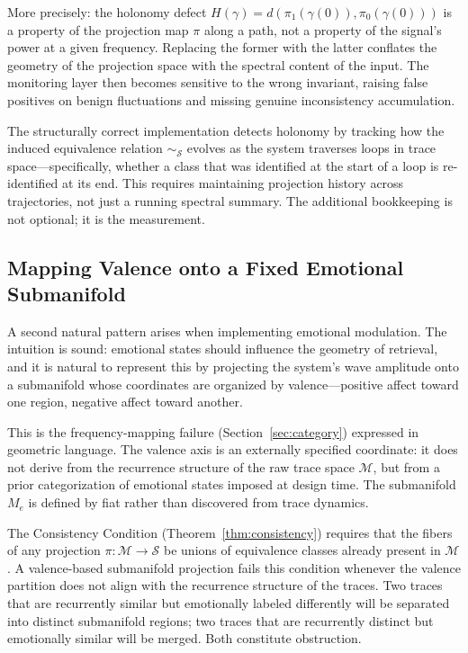 \documentclass[12pt,a4paper]{article}
\begin{document}
More precisely: the holonomy defect $H(\gamma) = d(\pi_1(\gamma(0)), \pi_0(\gamma(0)))$ is a property of the projection map $\pi$ along a path, not a property of the signal's power at a given frequency. Replacing the former with the latter conflates the geometry of the projection space with the spectral content of the input. The monitoring layer then becomes sensitive to the wrong invariant, raising false positives on benign fluctuations and missing genuine inconsistency accumulation.

The structurally correct implementation detects holonomy by tracking how the induced equivalence relation $\sim_\mathcal{S}$ evolves as the system traverses loops in trace space---specifically, whether a class that was identified at the start of a loop is re-identified at its end. This requires maintaining projection history across trajectories, not just a running spectral summary. The additional bookkeeping is not optional; it is the measurement.

\subsection{Mapping Valence onto a Fixed Emotional Submanifold}

A second natural pattern arises when implementing emotional modulation. The intuition is sound: emotional states should influence the geometry of retrieval, and it is natural to represent this by projecting the system's wave amplitude onto a submanifold whose coordinates are organized by valence---positive affect toward one region, negative affect toward another.

This is the frequency-mapping failure (Section~\ref{sec:category}) expressed in geometric language. The valence axis is an externally specified coordinate: it does not derive from the recurrence structure of the raw trace space $\mathcal{M}$, but from a prior categorization of emotional states imposed at design time. The submanifold $M_e$ is defined by fiat rather than discovered from trace dynamics.

The Consistency Condition (Theorem~\ref{thm:consistency}) requires that the fibers of any projection $\pi : \mathcal{M} \to \mathcal{S}$ be unions of equivalence classes already present in $\mathcal{M}$. A valence-based submanifold projection fails this condition whenever the valence partition does not align with the recurrence structure of the traces. Two traces that are recurrently similar but emotionally labeled differently will be separated into distinct submanifold regions; two traces that are recurrently distinct but emotionally similar will be merged. Both constitute obstruction.
\end{document}
